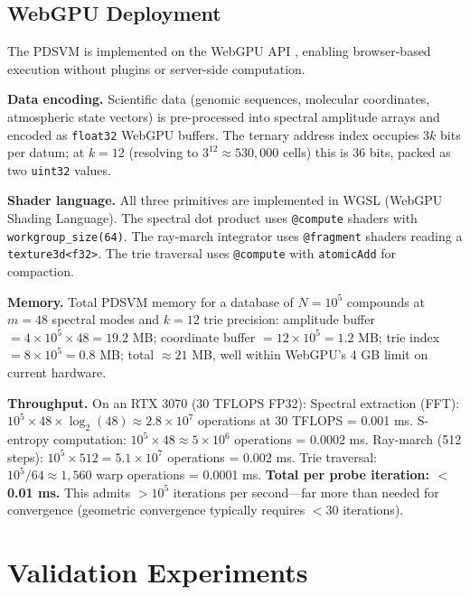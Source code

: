 \documentclass[10pt,twocolumn]{article}
\begin{document}
\subsection{WebGPU Deployment}

The PDSVM is implemented on the WebGPU API \cite{webgpu2023},
enabling browser-based execution without plugins or server-side computation.

\textbf{Data encoding.} Scientific data (genomic sequences, molecular coordinates,
atmospheric state vectors) is pre-processed into spectral amplitude arrays
and encoded as \texttt{float32} WebGPU buffers.
The ternary address index occupies $3k$ bits per datum; at $k=12$
(resolving to $3^{12} \approx 530{,}000$ cells) this is 36 bits,
packed as two \texttt{uint32} values.

\textbf{Shader language.} All three primitives are implemented in WGSL
(WebGPU Shading Language). The spectral dot product uses
\texttt{@compute} shaders with \texttt{workgroup\_size(64)}.
The ray-march integrator uses \texttt{@fragment} shaders reading
a \texttt{texture3d<f32>}. The trie traversal uses \texttt{@compute}
with \texttt{atomicAdd} for compaction.

\textbf{Memory.} Total PDSVM memory for a database of $N = 10^5$ compounds
at $m = 48$ spectral modes and $k = 12$ trie precision:
amplitude buffer $= 4 \times 10^5 \times 48 = 19.2$ MB;
coordinate buffer $= 12 \times 10^5 = 1.2$ MB;
trie index $= 8 \times 10^5 = 0.8$ MB;
total $\approx 21$ MB, well within WebGPU's 4 GB limit on current hardware.

\textbf{Throughput.} On an RTX 3070 (30 TFLOPS FP32):
Spectral extraction (FFT): $10^5 \times 48 \times \log_2(48) \approx 2.8 \times 10^7$ operations at 30 TFLOPS = 0.001 ms.
S-entropy computation: $10^5 \times 48 \approx 5 \times 10^6$ operations = 0.0002 ms.
Ray-march (512 steps): $10^5 \times 512 = 5.1 \times 10^7$ operations = 0.002 ms.
Trie traversal: $10^5 / 64 \approx 1,560$ warp operations = 0.0001 ms.
\textbf{Total per probe iteration: $<$ 0.01 ms.}
This admits $> 10^5$ iterations per second---far more than needed for convergence
(geometric convergence typically requires $< 30$ iterations).

\section{Validation Experiments}
\label{sec:validation}
\end{document}
